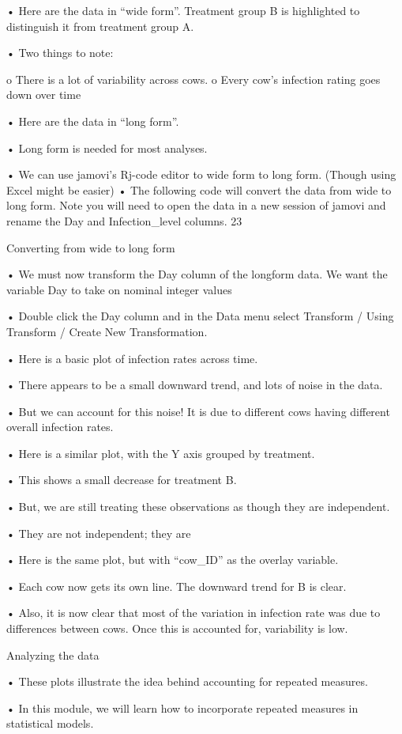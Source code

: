\documentclass[
  letterpaper,
  DIV=11,
  numbers=noendperiod]{scrreprt}
\begin{document}
• Here are the data in ``wide form''. Treatment group B is highlighted
to distinguish it from treatment group A.

• Two things to note:

o There is a lot of variability across cows. o Every cow's infection
rating goes down over time

• Here are the data in ``long form''.

• Long form is needed for most analyses.

• We can use jamovi's Rj-code editor to wide form to long form. (Though
using Excel might be easier) • The following code will convert the data
from wide to long form. Note you will need to open the data in a new
session of jamovi and rename the Day and Infection\_level columns. 23

Converting from wide to long form

• We must now transform the Day column of the longform data. We want the
variable Day to take on nominal integer values

• Double click the Day column and in the Data menu select Transform /
Using Transform / Create New Transformation.

• Here is a basic plot of infection rates across time.

• There appears to be a small downward trend, and lots of noise in the
data.

• But we can account for this noise! It is due to different cows having
different overall infection rates.

• Here is a similar plot, with the Y axis grouped by treatment.

• This shows a small decrease for treatment B.

• But, we are still treating these observations as though they are
independent.

• They are not independent; they are

• Here is the same plot, but with ``cow\_ID'' as the overlay variable.

• Each cow now gets its own line. The downward trend for B is clear.

• Also, it is now clear that most of the variation in infection rate was
due to differences between cows. Once this is accounted for, variability
is low.

Analyzing the data

• These plots illustrate the idea behind accounting for repeated
measures.

• In this module, we will learn how to incorporate repeated measures in
statistical models.
\end{document}
